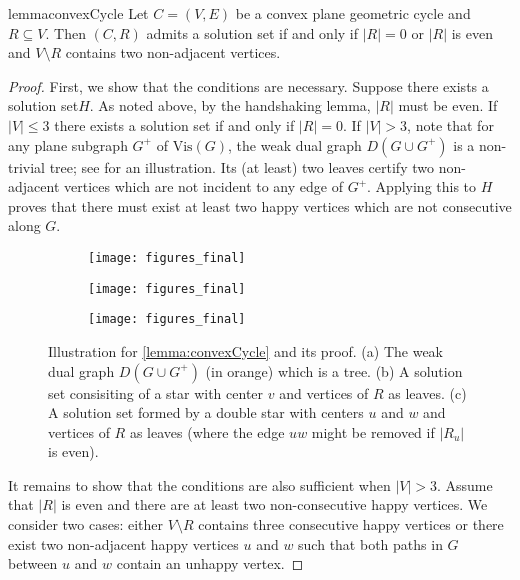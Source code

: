 \documentclass[a4paper,runningheads,cleveref,thm-restate]{lipics-v2021}
\newcommand{\Vis}[1]{\ensuremath{\mathrm{Vis}(#1)}}
\newcommand{\hset}{solution set\xspace}
\begin{document}
\begin{restatable}{lemma}{convexCycle}
	\label{lemma:convexCycle}
	Let $C=(V,E)$ be a convex plane geometric cycle and $R\subseteq V$.  
	Then $(C,R)$ admits a \hset if and only if {$|R|=0$ or} $|R|$ is even and $V\setminus R$ contains two non-adjacent vertices.
\end{restatable}
\begin{proof}
	First, we show that the conditions are necessary. 
	Suppose there exists a \hset $H$. 
	As noted above, by the handshaking lemma, 
	$|R|$ must be even. 
		If $|V|\le 3$ there exists a \hset if and only if $|R|=0$. 
		If $|V| > 3$, note that for any plane subgraph $G^+$ of \Vis{G}, the weak dual graph $D(G\cup G^+)$ is a non-trivial tree; see  for an illustration. 
	Its (at least) two leaves certify two non-adjacent vertices which are not incident to any edge of $G^+$. 
	Applying this to $H$ proves that there must exist at least two happy vertices which are not consecutive along $G$. 
	\begin{figure}[htb]
		\centering
		\begin{subfigure}{.3\textwidth}
			\centering
			\texttt{[image: figures\_final]}
			\caption{}
			\label{fig:cycleA}
		\end{subfigure}\hfill
		\begin{subfigure}{.3\textwidth}
			\centering
			\texttt{[image: figures\_final]}
			\caption{}
			\label{fig:cycleB}
		\end{subfigure}
		\hfill
		\begin{subfigure}{.3\textwidth}
			\centering
			\texttt{[image: figures\_final]}
			\caption{}
			\label{fig:cycleC}
		\end{subfigure}
		\caption{{Illustration for \cref{lemma:convexCycle} and its proof. (a) The weak dual graph $D(G\cup G^+)$ (in orange) which is a tree.  (b) A \hset consisiting of a star with center $v$ and vertices of $R$ as leaves.  (c) A \hset formed by a double star with centers $u$ and $w$ and vertices of $R$ as leaves (where the edge $uw$ might be removed if $|R_u|$ is even).}}
		\label{fig:cycle}
	\end{figure}
	
	It remains to show that the conditions are also sufficient {when $|V| > 3$}. 
	Assume that $|R|$ is even and there are at least two non-consecutive happy vertices. 
	We consider two cases: either $V\setminus R$  contains three consecutive happy vertices or there exist two non-adjacent happy vertices $u$ and $w$ 
	such that both paths in $G$ between $u$ and $w$ contain an unhappy vertex.  
	

\end{proof}
\end{document}
